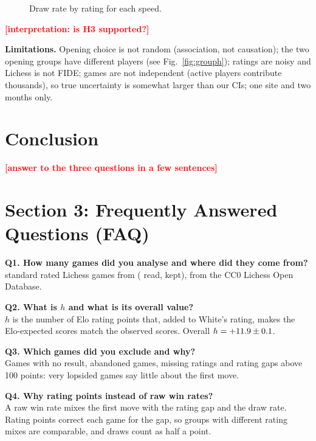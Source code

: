 \documentclass[11pt,a4paper]{article}
\newcommand{\TBD}[1]{\textcolor{red}{\textbf{[#1]}}}
\begin{document}
\begin{figure}[!htbp]
\centering
\FigSpeedDraws
\caption{Draw rate by rating for each speed.}
\end{figure}

\TBD{interpretation: is H3 supported?}

\FloatBarrier

\textbf{Limitations.} Opening choice is not random (association, not causation); the two opening
groups have different players (see Fig.~\ref{fig:grouph}); ratings are noisy and Lichess is not
FIDE; games are not independent (active players contribute thousands), so true uncertainty is
somewhat larger than our CIs; one site and two months only.

\section*{Conclusion}
\TBD{answer to the three questions in a few sentences}


\newpage

\section*{Section 3: Frequently Answered Questions (FAQ)}

\textbf{Q1. How many games did you analyse and where did they come from?}\\
\GamesUsed{} standard rated Lichess games from \MonthList{} (\GamesRead{} read, \PctUsed{} kept),
from the CC0 Lichess Open Database.

\textbf{Q2. What is $h$ and what is its overall value?}\\
$h$ is the number of Elo rating points that, added to White's rating, makes the Elo-expected
scores match the observed scores. Overall $h=+11.9\pm0.1$.

\textbf{Q3. Which games did you exclude and why?}\\
Games with no result, abandoned games, missing ratings and rating gaps above 100 points: very
lopsided games say little about the first move.

\textbf{Q4. Why rating points instead of raw win rates?}\\
A raw win rate mixes the first move with the rating gap and the draw rate. Rating points correct
each game for the gap, so groups with different rating mixes are comparable, and draws count
as half a point.
\end{document}
